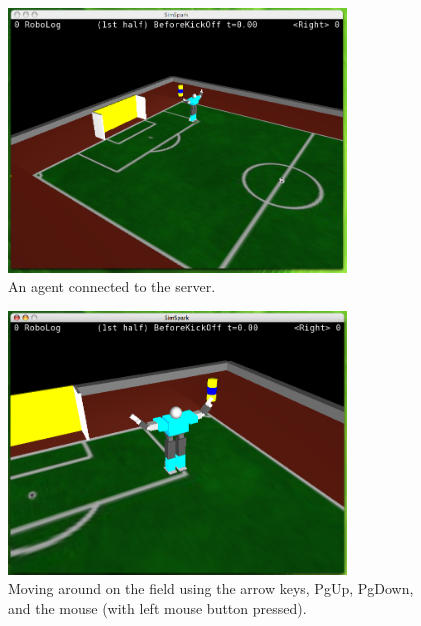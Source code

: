 \begin{figure}[htbp]
\begin{center}
\includegraphics[width=0.8\textwidth]{fig/agentconnect}
\caption{An agent connected to the server.}
\label{fig:agentconnect}
\end{center}
\end{figure}

\begin{figure}[htbp]
\begin{center}
\includegraphics[width=0.8\textwidth]{fig/movearound}
\caption{Moving around on the field using the arrow keys, PgUp, PgDown, and the mouse (with left mouse button pressed).}
\label{fig:movearound}
\end{center}
\end{figure}

